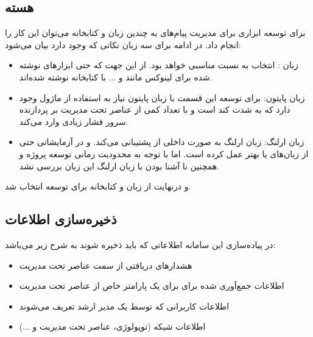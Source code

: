 \newpage

\subsection{هسته }
برای توسعه ابزاری برای مدیریت پیام‌های  به چندین زبان و کتابخانه می‌توان این کار را انجام داد. در ادامه برای سه زبان نکاتی که وجود دارد بیان می‌شود:

\begin{itemize}
    \item زبان : انتخاب به نسبت مناسبی خواهد بود. از این جهت که حتی ابزارهای نوشته شده برای لینوکس مانند  و ... با کتابخانه  نوشته شده‌اند.
    \item زبان پایتون: برای توسعه این قسمت با زبان پایتون نیاز به استفاده از ماژول  وجود دارد که به شدت کند است و با تعداد کمی از عناصر تحت مدیریت بر پردازنده سرور فشار زیادی وارد می‌کند.
    \item زبان ارلنگ: زبان ارلنگ به صورت داخلی از  پشتیبانی می‌کند. و در آزمایشاتی حتی از زبان‌های  یا  بهتر عمل کرده است\cite{vychodil_answer_2015}. اما با توجه به محدودیت زمانی توسعه پروژه و همچنین نا آشنا بودن با زبان ارلنگ این زبان بررسی نشد.
\end{itemize}

و درنهایت از زبان  و کتابخانه  برای توسعه انتخاب شد.


\subsection{ذخیره‌سازی اطلاعات}

در پیاده‌سازی این سامانه اطلاعاتی که باید ذخیره شوند به شرح زیر می‌باشد:
\begin{itemize}
    \item هشدارهای دریافتی از سمت عناصر تحت مدیریت
    \item اطلاعات جمع‌آوری شده برای برای یک پارامتر خاص از عناصر تحت مدیریت
    \item اطلاعات کاربرانی که توسط یک مدیر ارشد تعریف می‌شوند
    \item اطلاعات شبکه‌ (توپولوژی، عناصر تحت مدیریت و ...)

\end{itemize}

\newpage

